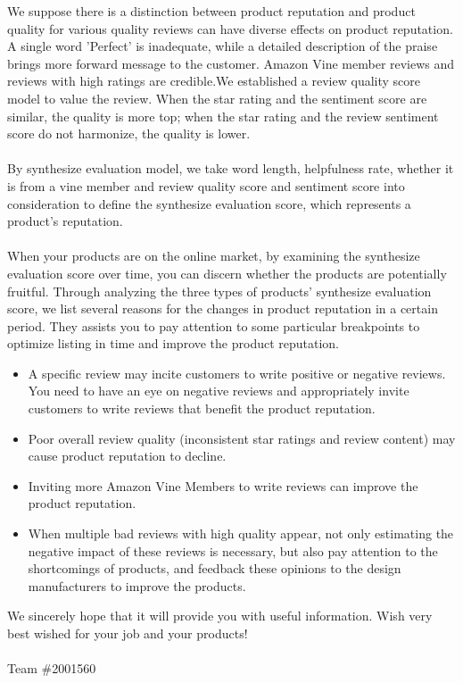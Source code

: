 \documentclass{mcmthesis}
\begin{document}
\begin{memo}[Letter]
We suppose there is a distinction between product reputation and product quality for various quality reviews can have diverse effects on product reputation. A single word 'Perfect' is inadequate, while a detailed description of the praise brings more forward message to the customer. Amazon Vine member reviews and reviews with high ratings are credible.We established a review quality score model to value the review. When the star rating and the sentiment score are similar, the quality is more top; when the star rating and the review sentiment score do not harmonize, the quality is lower.
\\\\
By synthesize evaluation model, we take word length, helpfulness rate, whether it is from a vine member and review quality score and sentiment score into consideration to define the synthesize evaluation score, which represents a product's reputation.
\\\\
When your products are on the online market, by examining the synthesize evaluation score over time, you can discern whether the products are potentially fruitful. Through analyzing the three types of products' synthesize evaluation score, we list several reasons for the changes in product reputation in a certain period. They assists you to pay attention to some particular breakpoints to optimize listing in time and improve the product reputation.
\begin{itemize}
	\item A specific review may incite customers to write positive or negative reviews. You need to have an eye on negative reviews and appropriately invite customers to write reviews that benefit the product reputation.

	\item Poor overall review quality (inconsistent star ratings and review content) may cause product reputation to decline.

	\item Inviting more Amazon Vine Members to write reviews can improve the product reputation.

	\item When multiple bad reviews with high quality appear, not only estimating the negative impact of these reviews is necessary, but also pay attention to the shortcomings of products, and feedback these opinions to the design manufacturers to improve the products.
\end{itemize}
We sincerely hope that it will provide you with useful information. Wish very best wished for your job and your products!\\\\
Team \#2001560

\end{memo}
\end{document}

